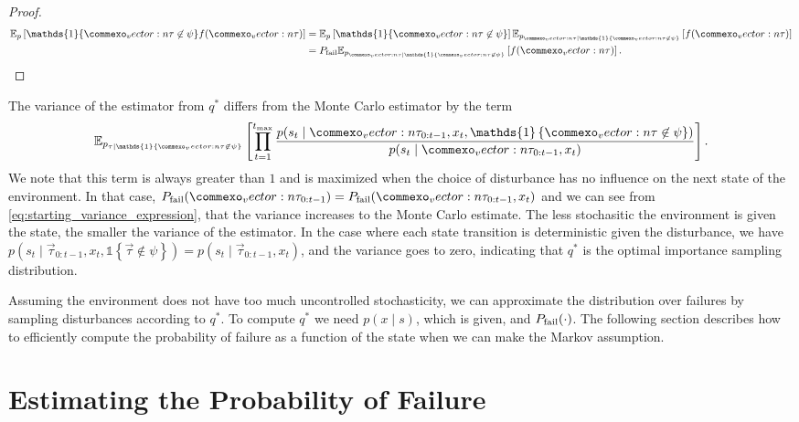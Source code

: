 \begin{proof}
\begin{align}
    \mathbb{E}_p \left[ \mathds{1} \{\vec{\tau} \not \in \psi\} f(\vec{\tau}) \right] &= \mathbb{E}_p \left[ \mathds{1} \{\vec{\tau} \not \in \psi\} \right] \mathbb{E}_{p_{\vec{\tau} \mid \mathds{1} \{\vec{\tau} \not \in \psi\}}}  \left[ f(\vec{\tau}) \right]  \\
    &= P_{\rm fail} \mathbb{E}_{p_{\vec{\tau} \mid \mathds{1} \{\vec{\tau} \not \in \psi\}}}  \left[ f(\vec{\tau}) \right]\text{.}
\end{align}
\end{proof}

The variance of the estimator from $q^*$ differs from the Monte Carlo estimator by the term
\begin{equation}
    \mathbb{E}_{p_{\tau \mid \mathds{1} \{\vec{\tau} \not \in \psi\}}}  \left[ \prod_{t=1}^{t_{\rm max}} \frac{p(s_t \mid \vec{\tau}_{0:t-1}, x_t, \mathds{1} \left\{ \vec{\tau} \not \in \psi \right\})}{p(s_t \mid \vec{\tau}_{0:t-1}, x_t)} \right] \text{.}
\end{equation}
We note that this term is always greater than $1$ and is maximized when the choice of disturbance has no influence on the next state of the environment. In that case, $P_{\rm fail}(\vec{\tau}_{0:t-1}) = P_{\rm fail}(\vec{\tau}_{0:t-1}, x_t)$ and we can see from  \cref{eq:starting_variance_expression}, that the variance increases to the Monte Carlo estimate. The less stochasitic the environment is given the state, the smaller the variance of the estimator. In the case where each state transition is deterministic given the disturbance, we have $p(s_t \mid \vec{\tau}_{0:t-1}, x_t, \mathds{1} \left\{ \vec{\tau} \not \in \psi \right\}) = p(s_t \mid \vec{\tau}_{0:t-1}, x_t)$, and the variance goes to zero, indicating that $q^*$ is the optimal importance sampling distribution. 

Assuming the environment does not have too much uncontrolled stochasticity, we can approximate the distribution over failures by sampling disturbances according to $q^*$. To compute $q^*$ we need $p(x \mid s)$, which is given, and $P_{\rm fail}(\cdot)$.  The following section describes how to efficiently compute the probability of failure as a function of the state when we can make the Markov assumption.


\section{Estimating the Probability of Failure}

